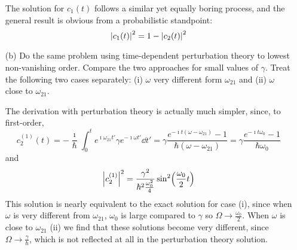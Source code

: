 \documentclass[a4paper,twoside]{article}
\begin{document}
\begin{itemize}
\begin{problem}
           The solution for $ c_1(t) $ follows a similar yet equally boring process, and the general result is obvious from a probabilistic standpoint:
           \begin{equation}
               \abs{c_1(t)}^2 = 1 - \abs{c_2(t)}^2
           \end{equation}
       \end{problem}
   \item[(b)] Do the same problem using time-dependent perturbation theory to lowest non-vanishing order. Compare the two approaches for small values of $ \gamma $. Treat the following two cases separately: (i) $ \omega $ very different form $ \omega_{21} $ and (ii) $ \omega $ close to $ \omega_{21} $.
        \begin{problem}
            The derivation with perturbation theory is actually much simpler, since, to first-order,
            \begin{equation}
                c_2^{(1)}(t) = - \frac{\imath}{\hbar} \int_0^t e^{\imath \omega_{21} t'} \gamma e^{- \imath \omega t'} \dd{t'} = \gamma \frac{e^{- \imath t (\omega - \omega_{21})} - 1}{\hbar (\omega - \omega_{21})} = \gamma \frac{e^{- \imath t \omega_0} - 1}{\hbar \omega_0}
            \end{equation}
            and
            \begin{equation}
                \abs{c_2^{(1)}}^2 = \frac{\gamma^2}{\hbar^2 \frac{\omega_0^2}{4}} \sin[2](\frac{\omega_0}{2} t)
            \end{equation}
            This solution is nearly equivalent to the exact solution for case (i), since when $ \omega $ is very different from $ \omega_{21} $, $ \omega_0 $ is large compared to $ \gamma $ so $ \Omega \to \frac{\omega_0}{2} $. When $ \omega $ is close to $ \omega_{21} $ (ii) we find that these solutions become very different, since $ \Omega \to \frac{\gamma}{\hbar} $, which is not reflected at all in the perturbation theory solution.
        \end{problem}
\end{itemize}
\end{document}
